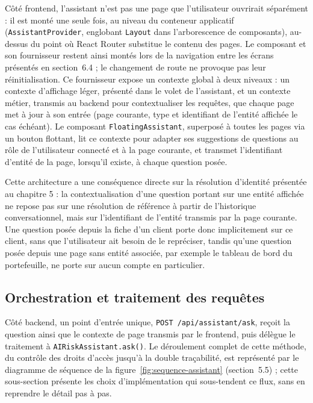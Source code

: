 Côté frontend, l'assistant n'est pas une page que l'utilisateur ouvrirait séparément : il est monté une seule fois, au niveau du conteneur applicatif (\texttt{AssistantProvider}, englobant \texttt{Layout} dans l'arborescence de composants), au-dessus du point où React Router substitue le contenu des pages. Le composant et son fournisseur restent ainsi montés lors de la navigation entre les écrans présentés en section~6.4 ; le changement de route ne provoque pas leur réinitialisation. Ce fournisseur expose un contexte global à deux niveaux : un contexte d'affichage léger, présenté dans le volet de l'assistant, et un contexte métier, transmis au backend pour contextualiser les requêtes, que chaque page met à jour à son entrée (page courante, type et identifiant de l'entité affichée le cas échéant). Le composant \texttt{FloatingAssistant}, superposé à toutes les pages via un bouton flottant, lit ce contexte pour adapter ses suggestions de questions au rôle de l'utilisateur connecté et à la page courante, et transmet l'identifiant d'entité de la page, lorsqu'il existe, à chaque question posée.

Cette architecture a une conséquence directe sur la résolution d'identité présentée au chapitre 5 : la contextualisation d'une question portant sur une entité affichée ne repose pas sur une résolution de référence à partir de l'historique conversationnel, mais sur l'identifiant de l'entité transmis par la page courante. Une question posée depuis la fiche d'un client porte donc implicitement sur ce client, sans que l'utilisateur ait besoin de le repréciser, tandis qu'une question posée depuis une page sans entité associée, par exemple le tableau de bord du portefeuille, ne porte sur aucun compte en particulier.

\subsection{Orchestration et traitement des requêtes}

Côté backend, un point d'entrée unique, \texttt{POST /api/assistant/ask}, reçoit la question ainsi que le contexte de page transmis par le frontend, puis délègue le traitement à \texttt{AIRiskAssistant.ask()}. Le déroulement complet de cette méthode, du contrôle des droits d'accès jusqu'à la double traçabilité, est représenté par le diagramme de séquence de la figure~\ref{fig:sequence-assistant} (section~5.5) ; cette sous-section présente les choix d'implémentation qui sous-tendent ce flux, sans en reprendre le détail pas à pas.


